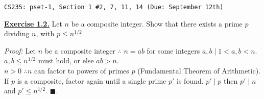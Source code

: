 \documentclass{article}
\begin{document}
\noindent
\textcolor{black!50}{\texttt{CS235: pset-1, Section 1 \#2, 7, 11, 14 (Due: September 12th)}}

\vspace{2em}
\noindent
\underline{\textbf{Exercise 1.2.}} Let \( n \) be a composite integer.
Show that there exists a prime \( p \) dividing \( n \), with \( p \leq n^{1/2} \).

\begin{greenbox}
    \textit{Proof:} Let $n$ be a composite integer $\therefore$ $n = ab$ for some integers $a, b\mid 1 < a, b < n$.\\
    $a,b \leq n^{1/2}$ must hold, or else $ab > n$.\\

    \noindent
    $n>0$ $\therefore n$ can factor to powers of primes $p$ (Fundamental Theorem of Arithmetic).
    If $p$ is a composite, factor again until a single prime $p'$ is found. $p'\mid p$ then $p' \mid n$ and $p' \leq n^{1/2}$. \hfill \(\blacksquare\).
\end{greenbox}
\end{document}
